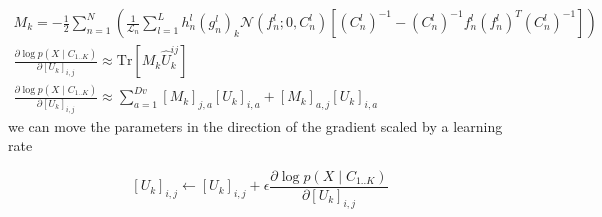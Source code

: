 \documentclass{paper}
\begin{document}
\begin{eqnarray}
M_k = -\frac{1}{2} \sum_{n=1}^N \left(\frac{1}{\mathcal{L}_n}  \sum_{l=1}^{L} h_n^l (g_n^l)_k \mathcal{N}(f_n^l;0,C_n^l)   \left[ (C_n^l)^{-1} - (C_n^l)^{-1} f_n^l (f_n^l)^T (C_n^l)^{-1} \right] \right) \\
\frac{\partial \log p(X \mid C_{1..K})}{\partial \left[ U_k \right]_{i,j}} \approx \textrm{Tr} \left[M_k \hat U_k^{ij} \right] \\
\frac{\partial \log p(X \mid C_{1..K})}{\partial \left[ U_k \right]_{i,j}} \approx \sum_{a=1}^{Dv} \left[ M_k \right]_{j,a} \left[ U_k \right]_{i,a} + \left[ M_k \right]_{a,j} \left[ U_k \right]_{i,a}
\end{eqnarray}
%
we can move the parameters in the direction of the gradient scaled by a learning rate

\begin{equation}
\left[ U_k \right]_{i,j} \leftarrow \left[ U_k \right]_{i,j} + \epsilon \frac{\partial \log p(X \mid C_{1..K})}{\partial \left[ U_k \right]_{i,j}}
\end{equation}
\end{document}

